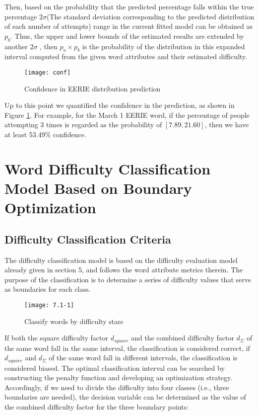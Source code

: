 \documentclass[12pt]{mcmthesis}
\begin{document}
Then, based on the probability that the predicted percentage falls within the true percentage $ 2\sigma $(The standard deviation corresponding to the predicted distribution of each number of attempts) range in the current fitted model can be obtained as $ p_{b}$. Thus, the upper and lower bounds of the estimated results are extended by another $ 2\sigma $
, then $ p_a\times p_b $ is the probability of the distribution in this expanded interval computed from the given word attributes and their estimated difficulty.
\begin{figure}[h]
	\small
	\centering
	\texttt{[image: conf]}
	\caption{Confidence in EERIE distribution prediction} 
	\label{fig:15}
\end{figure}

Up to this point we quantified the confidence in the prediction, as shown in Figure \ref{fig:15}. For example, for the March 1 EERIE word, if the percentage of people attempting 3 times is regarded as the probability of $ [7.89,21.60] $, then we have at least 53.49\% confidence.
\\[0.01pt]
\section{Word Difficulty Classification Model Based on Boundary Optimization}
\subsection{Difficulty Classification Criteria}
\hspace{1.4em}The difficulty classification model is based on the difficulty evaluation model already given in section 5, and follows the word attribute metrics therein. The purpose of the classification is to determine a series of difficulty values that serve as boundaries for each class.
\begin{figure}[h]
	\small
	\centering
	\texttt{[image: 7.1-1]}
	\caption{Classify words by difficulty stars} 
	\label{fig:13}
\end{figure}

If both the square difficulty factor $ d_{square} $ and the combined difficulty factor $ d_{\varSigma} $ of the same word fall in the same interval, the classification is considered correct, if $ d_{square} $ and $ d_{\varSigma} $ of the same word fall in different intervals, the classification is considered biased. The optimal classification interval can be searched by constructing the penalty function and developing an optimization strategy. Accordingly, if we need to divide the difficulty into four classes (i.e., three boundaries are needed), the decision variable can be determined as the value of the combined difficulty factor for the three boundary points: 
\end{document}
